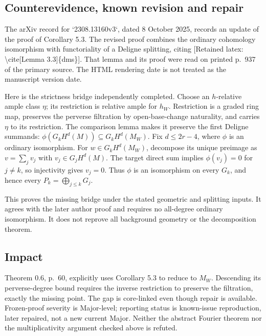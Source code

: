 \documentclass[10pt]{article}
\begin{document}
\subsection*{Counterevidence, known revision and repair}
The arXiv record for `2308.13160v3`, dated 8 October 2025, records an update of the proof of Corollary 5.3. The revised proof combines the ordinary cohomology isomorphism with functoriality of a Deligne splitting, citing [Retained latex: \textbackslash{}cite[Lemma 3.3]\{dms\}]. That lemma and its proof were read on printed p. 937 of the primary source. The HTML rendering date is not treated as the manuscript version date.\par
Here is the strictness bridge independently completed. Choose an \(h\)-relative ample class \(\eta\); its restriction is relative ample for \(h_W\). Restriction is a graded ring map, preserves the perverse filtration by open-base-change naturality, and carries \(\eta\) to its restriction. The comparison lemma makes it preserve the first Deligne summands: \(\phi(G_kH^d(M))\subseteq G_kH^d(M_W)\). Fix \(d\leq2r-4\), where \(\phi\) is an ordinary isomorphism. For \(w\in G_kH^d(M_W)\), decompose its unique preimage as \(v=\sum_jv_j\) with \(v_j\in G_jH^d(M)\). The target direct sum implies \(\phi(v_j)=0\) for \(j\ne k\), so injectivity gives \(v_j=0\). Thus \(\phi\) is an isomorphism on every \(G_k\), and hence every \(P_k=\bigoplus_{j\leq k}G_j\).\par
This proves the missing bridge under the stated geometric and splitting inputs. It agrees with the later author proof and requires no all-degree ordinary isomorphism. It does not reprove all background geometry or the decomposition theorem.\par
\subsection*{Impact}
Theorem 0.6, p. 60, explicitly uses Corollary 5.3 to reduce to \(M_W\). Descending its perverse-degree bound requires the inverse restriction to preserve the filtration, exactly the missing point. The gap is core-linked even though repair is available. Frozen-proof severity is Major-level; reporting status is known-issue reproduction, later repaired, not a new current Major. Neither the abstract Fourier theorem nor the multiplicativity argument checked above is refuted.\par
\end{document}
